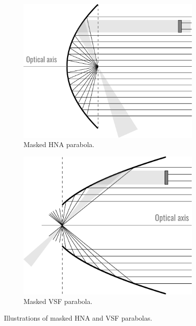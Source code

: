 \documentclass[11pt,SymmetricalJury]{inrsthesis/inrsthesis}
\begin{document}
\begin{figure}
  \begin{subfigure}[t]{0.47\textwidth}
    \centering
    \includegraphics{figs/masked_parabola_hna.pdf}
    \caption{Masked HNA parabola.}
    \label{fig:vsf-v-hna.hna}
  \end{subfigure}
  \hfill
  \begin{subfigure}[t]{0.47\textwidth}
    \centering
    \includegraphics{figs/masked_parabola_vsf.pdf}
    \caption{Masked VSF parabola.}
    \label{fig:vsf-v-hna.vsf}
  \end{subfigure}
  \caption[Illustrations of the masked HNA and VSF parabolas.]
          {Illustrations of masked HNA and VSF parabolas.}
  \label{fig:fwm.vsf-v-hna}
\end{figure}
\end{document}
